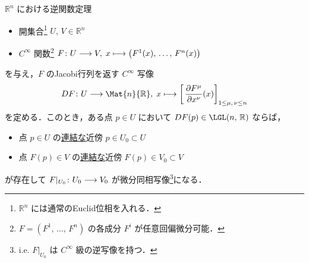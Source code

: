 \documentclass[TQFT_main]{subfiles}
\begin{document}
\begin{mytheo}[label=thm:inverse-function-Rn]{$\mathbb{R}^n$ における逆関数定理}
    \begin{itemize}
        \item 開集合\footnote{$\mathbb{R}^n$ には通常のEuclid位相を入れる．} $U,\, V \in \mathbb{R}^n$
        \item $C^\infty$ 関数\footnote{$F = (F^1,\, \dots,\, F^n)$ の各成分 $F^i$ が任意回偏微分可能．} $F \colon U \longrightarrow V,\; x \longmapsto \bigl( F^1(x),\, \dots,\, F^n(x) \bigr)$
    \end{itemize}
    を与え，$F$ のJacobi行列を返す $C^\infty$ 写像
    \begin{align}
        DF \colon U \lto \Mat{n}{\mathbb{R}},\; x \lmto \left[\, \pdv{F^\mu}{x^\nu} ()(x) \right]_{1 \le \mu,\, \nu \le n}
    \end{align}
    を定める．このとき，ある点 $p \in U$ において $DF(p) \in \LGL(n,\, \mathbb{R})$ ならば，
    \begin{itemize}
        \item 点 $p \in U$ の\underline{連結な}近傍 $p \in U_0 \subset U$
        \item 点 $F(p) \in V$ の\underline{連結な}近傍 $F(p) \in V_0 \subset V$
    \end{itemize}
    が存在して $F|_{U_0} \colon U_0 \longrightarrow V_0$ が微分同相写像\footnote{i.e. $F|_{U_0}$ は $C^\infty$ 級の逆写像を持つ．}になる．
\end{mytheo}
\end{document}
